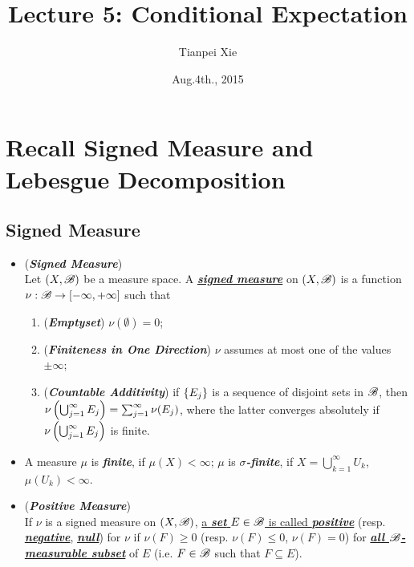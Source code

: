 \documentclass[11pt]{article}
\begin{document}
\title{Lecture 5: Conditional Expectation}
\author{ Tianpei Xie}
\date{ Aug.4th., 2015 }
\maketitle
\tableofcontents
\newpage
\section{Recall Signed Measure and Lebesgue Decomposition}
\subsection{Signed Measure}
\begin{itemize}
\item \begin{definition} (\emph{\textbf{Signed Measure}})\\
Let $(X, {\mathscr B})$ be a measure space. A \underline{\emph{\textbf{signed measure}}} on $(X, {\mathscr B})$ is a function $\nu: {\mathscr B} \rightarrow [-\infty, +\infty]$ such that 
\begin{enumerate}
\item (\emph{\textbf{Emptyset}}) $\nu(\emptyset)= 0$;
\item (\emph{\textbf{Finiteness in One Direction}}) $\nu$ assumes at most one of the values $\pm \infty$;
\item (\emph{\textbf{Countable Additivity}}) if $\left\{E_{j}\right\}$ is a sequence of disjoint sets in ${\mathscr B}$, then $\nu\left(\bigcup_{j=1}^{\infty}E_{j}\right)= \sum_{j=1}^{\infty}\nu(E_{j})$, where the latter converges absolutely if $\nu\left(\bigcup_{j=1}^{\infty}E_{j}\right)$ is finite.
\end{enumerate} 
\end{definition}

\item \begin{definition}
A measure $\mu$ is \emph{\textbf{finite}}, if $\mu(X)<\infty$; $\mu$ is \emph{\textbf{$\sigma$-finite}}, if $X= \bigcup_{k=1}^{\infty}U_{k}$, $\mu(U_k)<\infty$. 
\end{definition}

\item \begin{definition} (\emph{\textbf{Positive Measure}})\\
If $\nu$ is a signed measure on $(X,{\mathscr B})$, \underline{a \textbf{\emph{set}} $E\in {\mathscr B}$ is called \emph{\textbf{positive}}} (resp. \underline{\emph{\textbf{negative}}}, \underline{\emph{\textbf{null}}}) for $\nu$ if $\nu(F)\ge 0$ (resp. $\nu(F)\le 0$, $\nu(F)= 0$) for \underline{\emph{\textbf{all ${\mathscr B}$-measurable subset}}} of $E$ (i.e. $F\in {\mathscr B}$ such that $F\subseteq E$).  


\end{definition}
\end{itemize}
\end{document}
